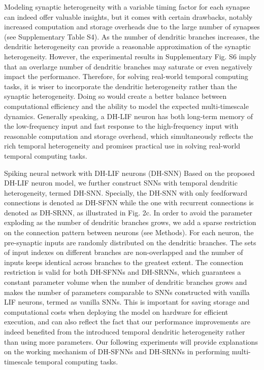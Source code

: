 Modeling synaptic heterogeneity with a variable timing factor for each synapse can indeed offer valuable insights, but it comes with certain drawbacks, notably increased computation and storage overheads due to the large number of synapses (see Supplementary Table S4). As the number of dendritic branches increases, the dendritic heterogeneity can provide a reasonable approximation of the synaptic heterogeneity. However, the experimental results in Supplementary Fig. S6 imply that an overlarge number of dendritic branches may saturate or even negatively impact the performance. Therefore, for solving real-world temporal computing tasks, it is wiser to incorporate the dendritic heterogeneity rather than the synaptic heterogeneity. Doing so would create a better balance between computational efficiency and the ability to model the expected multi-timescale dynamics. Generally speaking, a DH-LIF neuron has both long-term memory of the low-frequency input and fast response to the high-frequency input with reasonable computation and storage overhead, which simultaneously reflects the rich temporal heterogeneity and promises practical use in solving real-world temporal computing tasks.

Spiking neural network with DH-LIF neurons (DH-SNN)
Based on the proposed DH-LIF neuron model, we further construct SNNs with temporal dendritic heterogeneity, termed DH-SNN. Specially, the DH-SNN with only feedforward connections is denoted as DH-SFNN while the one with recurrent connections is denoted as DH-SRNN, as illustrated in Fig. 2c. In order to avoid the parameter exploding as the number of dendritic branches grows, we add a sparse restriction on the connection pattern between neurons (see Methods). For each neuron, the pre-synaptic inputs are randomly distributed on the dendritic branches. The sets of input indexes on different branches are non-overlapped and the number of inputs keeps identical across branches to the greatest extent. The connection restriction is valid for both DH-SFNNs and DH-SRNNs, which guarantees a constant parameter volume when the number of dendritic branches grows and makes the number of parameters comparable to SNNs constructed with vanilla LIF neurons, termed as vanilla SNNs. This is important for saving storage and computational costs when deploying the model on hardware for efficient execution, and can also reflect the fact that our performance improvements are indeed benefited from the introduced temporal dendritic heterogeneity rather than using more parameters. Our following experiments will provide explanations on the working mechanism of DH-SFNNs and DH-SRNNs in performing multi-timescale temporal computing tasks.

